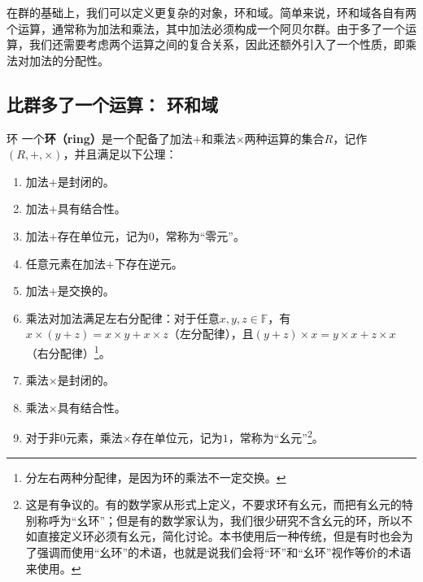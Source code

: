 
\begin{issues}
\issueDraft
{}
\end{issues}



在群的基础上，我们可以定义更复杂的对象，环和域。简单来说，环和域各自有两个运算，通常称为加法和乘法，其中加法必须构成一个阿贝尔群。由于多了一个运算，我们还需要考虑两个运算之间的复合关系，因此还额外引入了一个性质，即乘法对加法的分配性。

\subsection{比群多了一个运算： 环和域}






\begin{definition}{环}
一个\textbf{环（ring）}是一个配备了加法$+$和乘法$\times$两种运算的集合$R$，记作$(R, +, \times)$，并且满足以下公理：
\begin{enumerate}
    \item 加法$+$是封闭的。
    \item 加法$+$具有结合性。
    \item 加法$+$存在单位元，记为$0$，常称为“零元”。
    \item 任意元素在加法$+$下存在逆元。
    \item 加法$+$是交换的。
    \item 乘法对加法满足左右分配律：对于任意$x, y, z\in \mathbb{F}$，有$x\times(y+z)=x\times y+x\times z$（左分配律），且$(y+z)\times x=y\times x+z\times x$（右分配律）\footnote{分左右两种分配律，是因为环的乘法不一定交换。}。
    \item 乘法$\times$是封闭的。
    \item 乘法$\times$具有结合性。
    \item 对于非$0$元素，乘法$\times$存在单位元，记为$1$，常称为“幺元”\footnote{这是有争议的。有的数学家从形式上定义，不要求环有幺元，而把有幺元的特别称呼为“幺环”；但是有的数学家认为，我们很少研究不含幺元的环，所以不如直接定义环必须有幺元，简化讨论。本书使用后一种传统，但是有时也会为了强调而使用“幺环”的术语，也就是说我们会将“环”和“幺环”视作等价的术语来使用。}。
\end{enumerate}
\end{definition}


